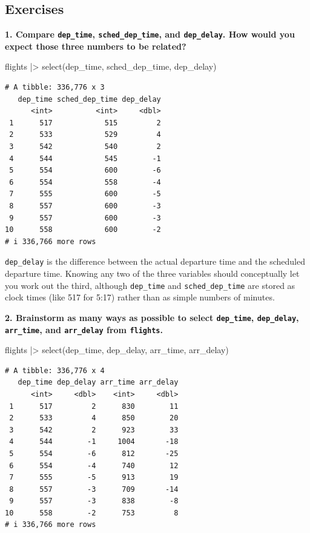 \documentclass[
  letterpaper,
  DIV=11,
  numbers=noendperiod]{scrreprt}
\newenvironment{Shaded}{\begin{snugshade}}{\end{snugshade}}
\newcommand{\FunctionTok}[1]{\textcolor[rgb]{0.28,0.35,0.67}{#1}}
\newcommand{\NormalTok}[1]{\textcolor[rgb]{0.00,0.23,0.31}{#1}}
\newcommand{\SpecialCharTok}[1]{\textcolor[rgb]{0.37,0.37,0.37}{#1}}
\begin{document}
\subsection{Exercises}\label{exercises-5}

\textbf{1. Compare \texttt{dep\_time}, \texttt{sched\_dep\_time}, and
\texttt{dep\_delay}. How would you expect those three numbers to be
related?}

\begin{Shaded}
\begin{Highlighting}[]
\NormalTok{flights }\SpecialCharTok{|\textgreater{}}
  \FunctionTok{select}\NormalTok{(dep\_time, sched\_dep\_time, dep\_delay)}
\end{Highlighting}
\end{Shaded}

\begin{verbatim}
# A tibble: 336,776 x 3
   dep_time sched_dep_time dep_delay
      <int>          <int>     <dbl>
 1      517            515         2
 2      533            529         4
 3      542            540         2
 4      544            545        -1
 5      554            600        -6
 6      554            558        -4
 7      555            600        -5
 8      557            600        -3
 9      557            600        -3
10      558            600        -2
# i 336,766 more rows
\end{verbatim}

\texttt{dep\_delay} is the difference between the actual departure time
and the scheduled departure time. Knowing any two of the three variables
should conceptually let you work out the third, although
\texttt{dep\_time} and \texttt{sched\_dep\_time} are stored as clock
times (like 517 for 5:17) rather than as simple numbers of minutes.

\textbf{2. Brainstorm as many ways as possible to select
\texttt{dep\_time}, \texttt{dep\_delay}, \texttt{arr\_time}, and
\texttt{arr\_delay} from \texttt{flights}.}

\begin{Shaded}
\begin{Highlighting}[]
\NormalTok{flights }\SpecialCharTok{|\textgreater{}}
  \FunctionTok{select}\NormalTok{(dep\_time, dep\_delay, arr\_time, arr\_delay)}
\end{Highlighting}
\end{Shaded}

\begin{verbatim}
# A tibble: 336,776 x 4
   dep_time dep_delay arr_time arr_delay
      <int>     <dbl>    <int>     <dbl>
 1      517         2      830        11
 2      533         4      850        20
 3      542         2      923        33
 4      544        -1     1004       -18
 5      554        -6      812       -25
 6      554        -4      740        12
 7      555        -5      913        19
 8      557        -3      709       -14
 9      557        -3      838        -8
10      558        -2      753         8
# i 336,766 more rows
\end{verbatim}
\end{document}
